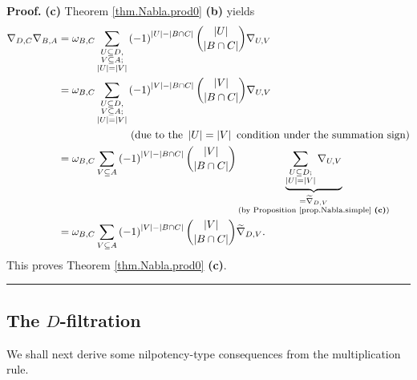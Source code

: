 \documentclass[numbers=enddot,12pt,final,onecolumn,notitlepage]{scrartcl}%
\numberwithin{exer}{subsection}
\theoremstyle{definition}
\newenvironment{proof}[1][Proof]{\noindent\textbf{#1.} }{\ \rule{0.5em}{0.5em}}
\let\sumnonlimits\sum
\renewcommand{\sum}{\sumnonlimits\limits}
\begin{document}
\begin{proof}
\textbf{(c)} Theorem \ref{thm.Nabla.prod0} \textbf{(b)} yields%
\begin{align*}
\nabla_{D,C}\nabla_{B,A}  &  =\omega_{B,C}\sum_{\substack{U\subseteq
D,\\V\subseteq A;\\\left\vert U\right\vert =\left\vert V\right\vert }}\left(
-1\right)  ^{\left\vert U\right\vert -\left\vert B\cap C\right\vert }%
\dbinom{\left\vert U\right\vert }{\left\vert B\cap C\right\vert }\nabla
_{U,V}\\
&  =\omega_{B,C}\sum_{\substack{U\subseteq D,\\V\subseteq A;\\\left\vert
U\right\vert =\left\vert V\right\vert }}\left(  -1\right)  ^{\left\vert
V\right\vert -\left\vert B\cap C\right\vert }\dbinom{\left\vert V\right\vert
}{\left\vert B\cap C\right\vert }\nabla_{U,V}\\
&  \ \ \ \ \ \ \ \ \ \ \ \ \ \ \ \ \ \ \ \ \left(  \text{due to the
}\left\vert U\right\vert =\left\vert V\right\vert \text{ condition under the
summation sign}\right) \\
&  =\omega_{B,C}\sum_{V\subseteq A}\left(  -1\right)  ^{\left\vert
V\right\vert -\left\vert B\cap C\right\vert }\dbinom{\left\vert V\right\vert
}{\left\vert B\cap C\right\vert }\underbrace{\sum_{\substack{U\subseteq
D;\\\left\vert U\right\vert =\left\vert V\right\vert }}\nabla_{U,V}%
}_{\substack{=\widetilde{\nabla}_{D,V}\\\text{(by Proposition
\ref{prop.Nabla.simple} \textbf{(c)})}}}\\
&  =\omega_{B,C}\sum_{V\subseteq A}\left(  -1\right)  ^{\left\vert
V\right\vert -\left\vert B\cap C\right\vert }\dbinom{\left\vert V\right\vert
}{\left\vert B\cap C\right\vert }\widetilde{\nabla}_{D,V}.
\end{align*}
This proves Theorem \ref{thm.Nabla.prod0} \textbf{(c)}.
\end{proof}

\subsection{The $D$-filtration}

We shall next derive some nilpotency-type consequences from the multiplication rule.
\end{document}
